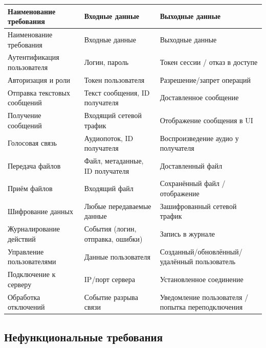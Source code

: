 \documentclass[14pt,a4paper]{extarticle}
\begin{document}
\begin{longtable}{|p{5cm}|p{5cm}|p{5cm}|}
\hline
Наименование требования & Входные данные & Выходные данные \\
\hline
\endfirsthead
\hline
Наименование требования & Входные данные & Выходные данные \\
\hline
\endhead

Аутентификация пользователя & Логин, пароль & Токен сессии / отказ в доступе \\
\hline
Авторизация и роли & Токен пользователя & Разрешение/запрет операций \\
\hline
Отправка текстовых сообщений & Текст сообщения, ID получателя & Доставленное сообщение \\
\hline
Получение сообщений & Входящий сетевой трафик & Отображение сообщения в UI \\
\hline
Голосовая связь & Аудиопоток, ID получателя & Воспроизведение аудио у получателя \\
\hline
Передача файлов & Файл, метаданные, ID получателя & Доставленный файл \\
\hline
Приём файлов & Входящий файл & Сохранённый файл / отображение \\
\hline
Шифрование данных & Любые передаваемые данные & Зашифрованный сетевой трафик \\
\hline
Журналирование действий & События (логин, отправка, ошибки) & Запись в журнале \\
\hline
Управление пользователями & Данные пользователя & Созданный/обновлённый/удалённый пользователь \\
\hline
Подключение к серверу & IP/порт сервера & Установленное соединение \\
\hline
Обработка отключений & Событие разрыва связи & Уведомление пользователя / попытка переподключения \\
\hline
\end{longtable}

\subsection{Нефункциональные требования}
\end{document}
